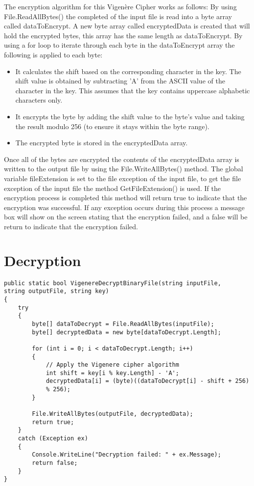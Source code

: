 \documentclass[a4paper,oneside,11pt]{book}
\begin{document}
The encryption algorithm for this Vigenère Cipher works as follows:
By using File.ReadAllBytes() the completed of the input file is read into a byte array called dataToEncrypt. A new byte array called encryptedData is created that will hold the encrypted bytes, this array has the same length as dataToEncrypt. By using a for loop to iterate through each byte in the dataToEncrypt array the following is applied to each byte:
\begin{itemize}
    \item 
        It calculates the shift based on the corresponding character in the key. The shift value is obtained by subtracting 'A' from the ASCII value of the character in the key. This assumes that the key contains uppercase alphabetic characters only.
    \item 
        It encrypts the byte by adding the shift value to the byte's value and taking the result modulo 256 (to ensure it stays within the byte range).
    \item 
        The encrypted byte is stored in the encryptedData array.
\end{itemize}
Once all of the bytes are encrypted the contents of the encryptedData array is written to the output file by using the File.WriteAllBytes() method. The global variable fileExtension is set to the file exception of the input file, to get the file exception of the input file the method GetFileExtension() is used. If the encryption process is completed this method will return true to indicate that the encryption was successful. If any exception occurs during this process a message box will show on the screen stating that the encryption failed, and a false will be return to indicate that the encryption failed.

\section{Decryption}

\begin{lstlisting}[language=Csh, caption={Code for Vigenère Cipher Decryption}]
public static bool VigenereDecryptBinaryFile(string inputFile, 
string outputFile, string key)
{
    try
    {
        byte[] dataToDecrypt = File.ReadAllBytes(inputFile);
        byte[] decryptedData = new byte[dataToDecrypt.Length];

        for (int i = 0; i < dataToDecrypt.Length; i++)
        {
            // Apply the Vigenere cipher algorithm
            int shift = key[i % key.Length] - 'A';
            decryptedData[i] = (byte)((dataToDecrypt[i] - shift + 256)
            % 256);
        }

        File.WriteAllBytes(outputFile, decryptedData);
        return true;
    }
    catch (Exception ex)
    {
        Console.WriteLine("Decryption failed: " + ex.Message);
        return false;
    }
}
\end{lstlisting}
\end{document}
